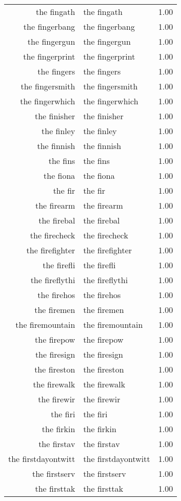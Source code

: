 \begin{table}[ht]
\begin{tabular}{rlr}
  the fingath & the fingath & 1.00 \\ 
  the fingerbang & the fingerbang & 1.00 \\ 
  the fingergun & the fingergun & 1.00 \\ 
  the fingerprint & the fingerprint & 1.00 \\ 
  the fingers & the fingers & 1.00 \\ 
  the fingersmith & the fingersmith & 1.00 \\ 
  the fingerwhich & the fingerwhich & 1.00 \\ 
  the finisher & the finisher & 1.00 \\ 
  the finley & the finley & 1.00 \\ 
  the finnish & the finnish & 1.00 \\ 
  the fins & the fins & 1.00 \\ 
  the fiona & the fiona & 1.00 \\ 
  the fir & the fir & 1.00 \\ 
  the firearm & the firearm & 1.00 \\ 
  the firebal & the firebal & 1.00 \\ 
  the firecheck & the firecheck & 1.00 \\ 
  the firefighter & the firefighter & 1.00 \\ 
  the firefli & the firefli & 1.00 \\ 
  the fireflythi & the fireflythi & 1.00 \\ 
  the firehos & the firehos & 1.00 \\ 
  the firemen & the firemen & 1.00 \\ 
  the firemountain & the firemountain & 1.00 \\ 
  the firepow & the firepow & 1.00 \\ 
  the firesign & the firesign & 1.00 \\ 
  the fireston & the fireston & 1.00 \\ 
  the firewalk & the firewalk & 1.00 \\ 
  the firewir & the firewir & 1.00 \\ 
  the firi & the firi & 1.00 \\ 
  the firkin & the firkin & 1.00 \\ 
  the firstav & the firstav & 1.00 \\ 
  the firstdayontwitt & the firstdayontwitt & 1.00 \\ 
  the firstserv & the firstserv & 1.00 \\ 
  the firsttak & the firsttak & 1.00 \\ 

\end{tabular}
\end{table}
